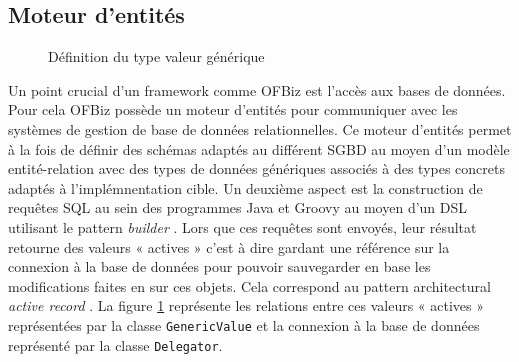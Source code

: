 \documentclass[a4paper, 11pt]{report}
\begin{document}
\subsection{Moteur d'entités}

\begin{figure}
  \centering
  \caption{Définition du type valeur générique}
  \label{fig:genericvalue}
\end{figure}

Un point crucial d'un framework comme OFBiz est l'accès aux bases de
données. Pour cela OFBiz possède un moteur d'entités pour communiquer
avec les systèmes de gestion de base de données relationnelles. Ce moteur d'entités
permet à la fois de définir des schémas adaptés au différent SGBD au
moyen d'un modèle entité-relation avec des types de données génériques
associés à des types concrets adaptés à l'implémnentation cible. Un
deuxième aspect est la construction de requêtes SQL au sein des
programmes Java et Groovy au moyen d'un DSL utilisant le pattern
\emph{builder} \cite{gamma1993design}. Lors que ces requêtes sont
envoyés, leur résultat retourne des valeurs « actives » c'est à dire
gardant une référence sur la connexion à la base de données pour
pouvoir sauvegarder en base les modifications faites en sur ces
objets. Cela correspond au pattern architectural \emph{active record}
\cite{fowler2002patterns}. La figure \ref{fig:genericvalue}
représente les relations entre ces valeurs « actives » représentées par
la classe \verb=GenericValue= et la connexion à la base de données
représenté par la classe \verb=Delegator=.
\end{document}
